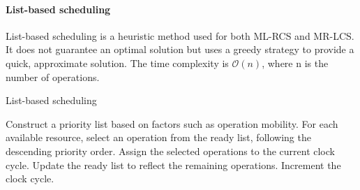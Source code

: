 \paragraph*{List-based scheduling}
List-based scheduling is a heuristic method used for both ML-RCS and MR-LCS. 
It does not guarantee an optimal solution but uses a greedy strategy to provide a quick, approximate solution. 
The time complexity is $\mathcal{O}(n)$, where n is the number of operations.
\begin{algorithm}[H]
    \caption{List-based scheduling}
        \begin{algorithmic}[1]
            \State Construct a priority list based on factors such as operation mobility.
                \State For each available resource, select an operation from the ready list, following the descending priority order.
                \State Assign the selected operations to the current clock cycle.
                \State Update the ready list to reflect the remaining operations.
                \State Increment the clock cycle.
            \EndWhile
        \end{algorithmic}
\end{algorithm} 